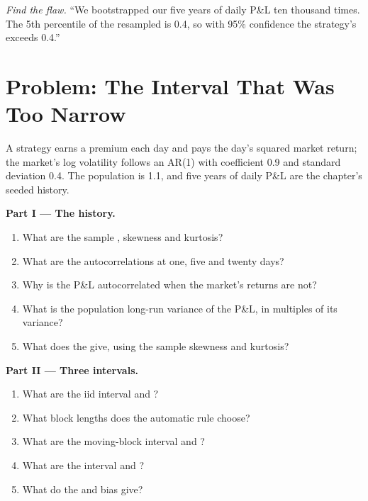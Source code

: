 \begin{exercise}[$\star\star\star$]\label{exo:qm:resampling:8}
\emph{Find the flaw.} ``We bootstrapped our five years of daily P\&L ten thousand times. The 5th percentile of the resampled  is 0.4, so with 95\% confidence the strategy's  exceeds 0.4.''
\end{exercise}

\section{Problem: The Interval That Was Too Narrow}

\begin{problem}\label{pb:qm:resampling:1}
A strategy earns a premium each day and pays the day's squared market return; the market's log volatility follows an AR(1) with
coefficient 0.9 and standard deviation 0.4. The population  is 1.1, and five years of daily P\&L are the chapter's seeded
history.

\medskip\noindent\textbf{Part I --- The history.}
\begin{enumerate}
\item What are the sample , skewness and kurtosis?
\item What are the autocorrelations at one, five and twenty days?
\item Why is the P\&L autocorrelated when the market's returns are not?
\item What is the population long-run variance of the P\&L, in multiples of its variance?
\item What  does the  give, using the sample skewness and kurtosis?
\end{enumerate}

\medskip\noindent\textbf{Part II --- Three intervals.}
\begin{enumerate}[resume]
\item What are the iid  interval and ?
\item What block lengths does the automatic rule choose?
\item What are the moving-block interval and ?
\item What are the  interval and ?
\item What do the   and bias give?
\end{enumerate}


\end{problem}
